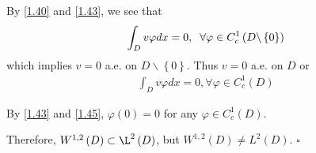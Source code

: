 \documentclass[a4paper]{article}
\numberwithin{equation}{section}
\begin{document}
By \eqref{1.40} and \eqref{1.43}, we see that
\begin{align}
\int_D {v\varphi dx}  = 0,\hspace{0.2cm}\forall \varphi  \in C_c^1\left( {D\backslash \left\{ 0 \right\}} \right)
\end{align}
which implies $v=0$ a.e. on $D\backslash \left\{ 0\right\}$. Thus $v=0$ a.e. on $D$ or
\begin{align}
\label{1.45}
\int_D {v\varphi dx}  = 0,\forall \varphi  \in C_c^1\left( D \right)
\end{align}

By \eqref{1.43} and \eqref{1.45}, $\varphi \left(0\right) =0$ for any $\varphi \in C_c^1\left(D\right)$.

Therefore, $W^{1,2}\left(D\right) \subset \L^2\left(D\right)$, but $W^{1,2}\left(D\right) \ne L^2\left(D\right)$. \hfill $\square$\\
\end{document}
